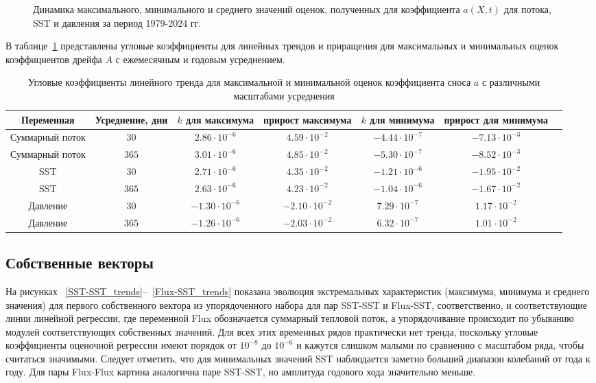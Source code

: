 \begin{figure}
	\caption{Динамика максимального, минимального и среднего значений оценок, полученных для коэффициента $a(X,t)$ для потока, SST и давления за период 1979-2024 гг.} 
	\label{a_extreme_365}
\end{figure}

В таблице~\ref{table_angular_3d} представлены угловые коэффициенты для линейных трендов и приращения для максимальных и минимальных оценок коэффициентов дрейфа $A$ с ежемесячным и годовым усреднением.

\begin{table}
	\caption{Угловые коэффициенты линейного тренда для максимальной и минимальной оценок коэффициента сноса $a$ с различными масштабами усреднения \label{table_angular_3d}}
	\centering
	\begin{tabular}{|c|c|c|c|c|c|c|}
		\hline
		Переменная & Усреднение, дни & $k$ для максимума & прирост максимума & $k$ для минимума & прирост для минимума\\
		\hline
		Суммарный поток & $30$ & $2.86 \cdot 10^{-6}$ & $4.59 \cdot 10^{-2}$ & $-4.44 \cdot 10^{-7}$ & $-7.13 \cdot 10^{-3}$ \\
		Суммарный поток & $365$ & $3.01 \cdot 10^{-6}$ & $4.85 \cdot 10^{-2}$ & $-5.30 \cdot 10^{-7}$ & $-8.52 \cdot 10^{-3}$    \\
		SST & $30$ & $2.71 \cdot 10^{-6}$ & $4.35 \cdot 10^{-2}$ & $-1.21 \cdot 10^{-6}$ & $-1.95 \cdot 10^{-2}$   \\
		SST & $365$ & $2.63 \cdot 10^{-6}$ & $4.23 \cdot 10^{-2}$ & $-1.04 \cdot 10^{-6}$ & $-1.67 \cdot 10^{-2}$    \\
		Давление & $30$ & $-1.30 \cdot 10^{-6}$ & $-2.10 \cdot 10^{-2}$ & $7.29 \cdot 10^{-7}$ & $1.17 \cdot 10^{-2}$ \\
		Давление & $365$ & $-1.26 \cdot 10^{-6}$ & $-2.03 \cdot 10^{-2}$ & $6.32 \cdot 10^{-7}$ & $1.01 \cdot 10^{-2}$ \\
		\hline
	\end{tabular}
\end{table}


\subsection{Собственные векторы}
На рисунках ~\ref{SST-SST_trends}--~\ref{Flux-SST_trends} показана эволюция экстремальных характеристик (максимума, минимума и среднего значения) для первого собственного вектора из упорядоченного набора для пар SST-SST и Flux-SST, соответственно, и соответствующие линии линейной регрессии, где переменной Flux обозначается суммарный тепловой поток, а упорядочивание происходит по убыванию модулей соответствующих собственных значений. Для всех этих временных рядов практически нет тренда, поскольку угловые коэффициенты оценочной регрессии имеют порядок от $10^{-8}$ до $10^{-6}$ и кажутся слишком малыми по сравнению с масштабом ряда, чтобы считаться значимыми. Следует отметить, что для минимальных значений SST наблюдается заметно больший диапазон колебаний от года к году. Для пары Flux-Flux картина аналогична паре SST-SST, но амплитуда годового хода значительно меньше.

